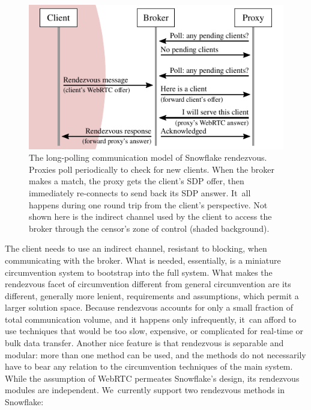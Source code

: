 \documentclass[letterpaper,twocolumn]{article}
\begin{document}
\begin{figure}
\includegraphics{figures/rendezvous/rendezvous}
\caption{
The long-polling communication model of Snowflake rendezvous.
Proxies poll periodically to check for new clients.
When the broker makes a match,
the proxy gets the client's SDP offer,
then immediately re-connects to send back its SDP answer.
It~all happens during one round trip from the client's perspective.
Not shown here is the indirect channel
used by the client to access the broker through the censor's zone of control
(shaded background).
}
\label{fig:rendezvous}
\end{figure}

The client needs to use an indirect channel,
resistant to blocking,
when communicating with the broker.
What is needed, essentially,
is a miniature circumvention system
to bootstrap into the full system.
What makes the rendezvous facet of circumvention
different from general circumvention
are its different, generally more lenient, requirements and assumptions,
which permit a larger solution space.
Because rendezvous accounts for only a small fraction
of total communication volume,
and it happens only infrequently,
it~can afford to use techniques that would be
too slow, expensive, or complicated
for real-time or bulk data transfer.
Another nice feature is that rendezvous is separable and modular:
more than one method can be used,
and the methods do not necessarily have to bear any relation
to the circumvention techniques of the main system.
While the assumption of WebRTC permeates Snowflake's design,
its rendezvous modules are independent.
We~currently support two rendezvous methods in Snowflake:
\end{document}
